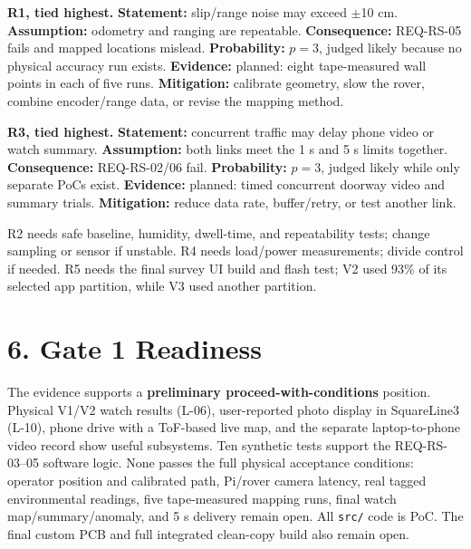 \documentclass[10pt,letterpaper]{article}
\begin{document}
\textbf{R1, tied highest.} \textbf{Statement:} slip/range noise may exceed $\pm$10 cm. \textbf{Assumption:} odometry and ranging are repeatable. \textbf{Consequence:} REQ-RS-05 fails and mapped locations mislead. \textbf{Probability:} $p=3$, judged likely because no physical accuracy run exists. \textbf{Evidence:} planned: eight tape-measured wall points in each of five runs. \textbf{Mitigation:} calibrate geometry, slow the rover, combine encoder/range data, or revise the mapping method.

\textbf{R3, tied highest.} \textbf{Statement:} concurrent traffic may delay phone video or watch summary. \textbf{Assumption:} both links meet the 1 s and 5 s limits together. \textbf{Consequence:} REQ-RS-02/06 fail. \textbf{Probability:} $p=3$, judged likely while only separate PoCs exist. \textbf{Evidence:} planned: timed concurrent doorway video and summary trials. \textbf{Mitigation:} reduce data rate, buffer/retry, or test another link.

R2 needs safe baseline, humidity, dwell-time, and repeatability tests; change sampling or sensor if unstable. R4 needs load/power measurements; divide control if needed. R5 needs the final survey UI build and flash test; V2 used 93\% of its selected app partition, while V3 used another partition.

\section*{6. Gate 1 Readiness}

The evidence supports a \textbf{preliminary proceed-with-conditions} position. Physical V1/V2 watch results (L-06), user-reported photo display in SquareLine3 (L-10), phone drive with a ToF-based live map, and the separate laptop-to-phone video record show useful subsystems. Ten synthetic tests support the REQ-RS-03--05 software logic. None passes the full physical acceptance conditions: operator position and calibrated path, Pi/rover camera latency, real tagged environmental readings, five tape-measured mapping runs, final watch map/summary/anomaly, and 5 s delivery remain open. All \texttt{src/} code is PoC. The final custom PCB and full integrated clean-copy build also remain open.
\end{document}
